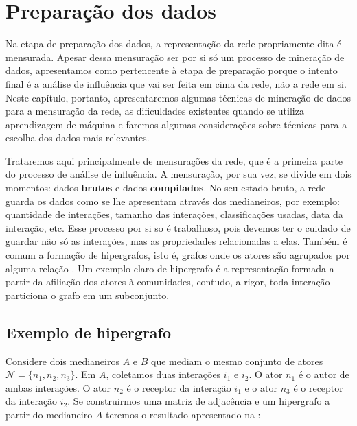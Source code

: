 \chapter{Preparação dos dados}
\label{ch:preparacao}

Na etapa de preparação dos dados, a representação da rede propriamente dita é
mensurada. Apesar dessa mensuração ser por si só um processo de mineração de
dados, apresentamos como pertencente à etapa de preparação porque o intento final
é a análise de influência que vai ser feita em cima da rede, não a rede em si.
Neste capítulo, portanto, apresentaremos algumas técnicas de mineração de dados
para a mensuração da rede, as dificuldades existentes quando se utiliza
aprendizagem de máquina e faremos algumas considerações sobre técnicas para a
escolha dos dados mais relevantes.

Trataremos aqui principalmente de mensurações da rede, que é a primeira parte do
processo de análise de influência. A mensuração, por sua vez, se divide em dois
momentos: dados \textbf{brutos} e dados \textbf{compilados}. No seu estado bruto,
a rede guarda os dados como se lhe apresentam através dos medianeiros, por
exemplo: quantidade de interações, tamanho das interações, classificações usadas,
data da interação, etc. Esse processo por si so é trabalhoso, pois devemos ter o
cuidado de guardar não só as interações, mas as propriedades relacionadas a elas.
Também é comum a formação de hipergrafos, isto é, grafos onde os atores são
agrupados por alguma relação \citep{Breiger1974, Seidman1978}. Um exemplo
claro de hipergrafo é a representação formada a partir da afiliação dos atores à
comunidades, contudo, a rigor, toda interação particiona o grafo em um
subconjunto.

\section{Exemplo de hipergrafo}

Considere dois medianeiros $A$ e $B$ que mediam o mesmo conjunto de
atores $\mathscr{N} = \{n_1, n_2, n_3\}$. Em $A$, coletamos duas interações
$i_1$ e $i_2$. O ator $n_1$ é o autor de ambas interações. O ator $n_2$ é o
receptor da interação $i_1$ e o ator $n_3$ é o receptor da interação $i_2$. Se
construirmos uma matriz de adjacência e um hipergrafo a partir do medianeiro $A$
teremos o resultado apresentado na :

